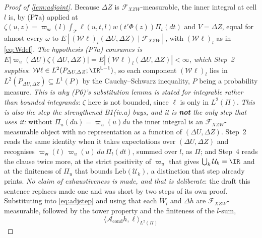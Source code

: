 \begin{proof}[Proof of \cref{lem:adjoint}]
Because $\Delta Z$ is $\mathcal F_{XZW}$-measurable, the inner integral at cell $l$ is, by (P7a) applied at
$\zeta(u,z)=\varpi_{\mathsf w}(l)\int_{\mathcal T}\ell(u,t,l)w(t'\Phi(z))\Pi_t(dt)$ and $V=\Delta Z$,
equal for almost every $\omega$ to
$E[(\mathcal W\ell)_l(\Delta U,\Delta Z)\mid\mathcal F_{XZW}]$, with $(\mathcal W\ell)_l$ as in
\eqref{eq:Wdef}. \emph{The hypothesis (P7a) consumes is
$E|\varpi_u(\Delta U)\zeta(\Delta U,\Delta Z)|=E|(\mathcal W\ell)_l(\Delta U,\Delta Z)|<\infty$, which
Step~2
supplies}:
$\mathcal W\ell\in L^{2}(P_{\Delta U,\Delta Z};\IR^{\mathsf L-1})$, so each component
$(\mathcal W\ell)_l$ lies in $L^{2}(P_{\Delta U,\Delta Z})\subseteq L^{1}(P)$
by the Cauchy--Schwarz
inequality, $P$ being a probability measure. \emph{This is why (P6)'s substitution lemma is stated for
integrable rather than bounded integrands}: $\zeta$ here is not bounded, since $\ell$ is only in
$L^{2}(\Pi)$.
\emph{This is also the step the
strengthened
B1\textup{(iv.a)} buys, and it is \textbf{not} the only step that uses it:} without $\Pi_u(du)=\varpi_u(u)du$ the
inner integral is an $\mathcal F_{XZW}$-measurable object with no representation as a function of
$(\Delta U,\Delta Z)$. Step~2 reads the same identity when it takes expectations over
$(\Delta U,\Delta Z)$ and recognises $\varpi_{\mathsf w}(l)\,\varpi_u(u)\,du\,\Pi_t(dt)$, summed over
$l$, as $\Pi$; and Step~4 reads the clause twice more, at the strict positivity of $\varpi_u$ that
gives $\bigcup_k\mathcal U_k=\IR$ and at the finiteness of $\Pi_u$ that bounds
$\mathrm{Leb}(\mathcal U_k)$, a distinction that step already prints. \emph{No claim of
exhaustiveness is made, and that is deliberate}: the draft this sentence replaces made one and was
short by two steps of its own proof. Substituting into \eqref{eq:adjstep} and using that each $\widetilde W_l$ and
$\Delta h$
are $\mathcal F_{XZW}$-measurable, followed by the tower property and the finiteness of the $l$-sum,
\[
\langle\mathcal A_{\mathrm{cond}}h,\ell\rangle_{L^{2}(\Pi)}
\]
\end{proof}
